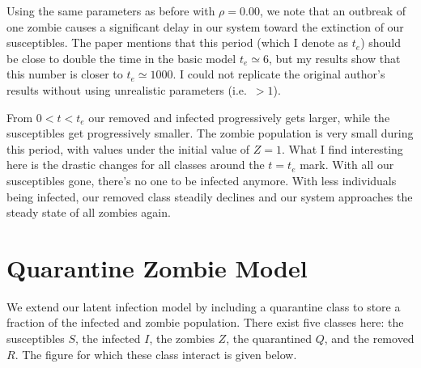 \documentclass[]{article}
\begin{document}
Using the same parameters as before with $\rho = 0.00$, we note that an outbreak of one zombie causes a significant delay in our system toward the extinction of our susceptibles. The paper mentions that this period (which I denote as $t_e$) should be close to double the time in the basic model $t_e \simeq 6$, but my results show that this number is closer to $t_e \simeq 1000$. I could not replicate the original author's results without using unrealistic parameters (i.e.\ $> 1$).

\begin{figure}[H]
\end{figure}

From $0 < t < t_e$ our removed and infected progressively gets larger, while the
susceptibles get progressively smaller. The zombie population is very small during this
period, with values under the initial value of $Z = 1$. What I find interesting here is the
drastic changes for all classes around the $t = t_e$ mark. With all our susceptibles gone,
there’s no one to be infected anymore. With less individuals being infected, our removed
class steadily declines and our system approaches the steady state of all zombies again.

\section{Quarantine Zombie Model}
We extend our latent infection model by including a quarantine class to store a
fraction of the infected and zombie population. There exist five classes here: the
susceptibles $S$, the infected $I$, the zombies $Z$, the quarantined $Q$, and the removed $R$.
The figure for which these class interact is given below.
\end{document}
